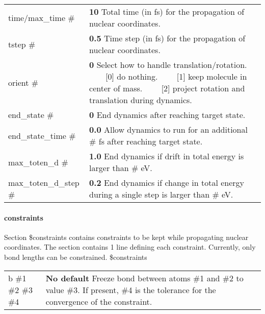 \documentclass{report}
\newcommand{\tabitem}{~~\llap{--}~~}
\begin{document}
\begin{tabularx}{\textwidth}{ m{3.5cm} X }
time/max\_time \#	&
	\textbf{10} \newline
	Total time (in fs) for the propagation of nuclear coordinates.  \\

tstep \#		&
	\textbf{0.5} \newline
	Time step (in fs) for the propagation of nuclear coordinates.  \\

orient \#		&
	\textbf{0} \newline
	Select how to handle translation/rotation. \newline
	\tabitem [0] do nothing. \newline
	\tabitem [1] keep molecule in center of mass. \newline
	\tabitem [2] project rotation and translation during dynamics. \\

end\_state \#		&
	\textbf{0} \newline
	End dynamics after reaching target state. \\

end\_state\_time \#	&
	\textbf{0.0} \newline
	Allow dynamics to run for an additional \# fs after reaching target state. \\

max\_toten\_d \#	&
	\textbf{1.0} \newline
	End dynamics if drift in total energy is larger than \# eV. \\

max\_toten\_d\_step \#	&
	\textbf{0.2} \newline
	End dynamics if change in total energy during a single step is larger than \# eV. \\
\end{tabularx}


\paragraph{constraints}
Section \$constraints contains constraints to be kept while propagating nuclear coordinates. The section contains 1 line defining each constraint. Currently, only bond lengths can be constrained. \newline
\$constraints

\begin{tabularx}{\textwidth}{ m{2.5cm} X }
b \#1 \#2 \#3 \#4		&
	\textbf{No default} \newline
	Freeze bond between atoms \#1 and \#2 to value \#3. If present, \#4 is the tolerance for the convergence of the constraint.  \\

\end{tabularx}
\end{document}
